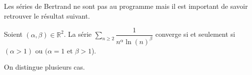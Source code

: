 \documentclass[a4paper,10pt]{report}
\newcommand{\Sum}[2]{\ensuremath{\textstyle{\sum\limits_{#1}^{#2}}}}
\begin{document}
\noindent Les séries de Bertrand ne sont pas au programme mais il est important de savoir retrouver le résultat suivant.

\begin{prop} 
Soient $(\alpha, \beta) \in \mathbb{R}^2$. La série $\Sum{n \geq 2}{} \dfrac{1}{n^{\alpha} \ln(n)^{\beta}}$ converge si et seulement si $(\alpha > 1)$ ou $(\alpha = 1$ et $\beta >1$).
\end{prop}

\begin{preuve} On distingue plusieurs cas.

\vspace{10.5cm}

\end{preuve}
\end{document}
